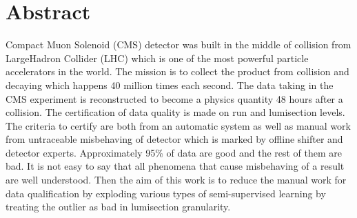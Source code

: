 \chapter*{\Large \center Abstract}


Compact Muon Solenoid (CMS) detector was built in the middle of collision from LargeHadron Collider (LHC) which is one of the most powerful particle accelerators in the world. The mission is to collect the product from collision and decaying which happens 40 million times each second. The data taking in the CMS experiment is reconstructed to become a physics quantity 48 hours after a collision. The certification of data quality is made on run and lumisection levels. The criteria to certify are both from an automatic system as well as manual work from untraceable misbehaving of detector which is marked by offline shifter and detector experts. Approximately 95\% of data are good and the rest of them are bad. It is not easy to say that all phenomena that cause misbehaving of a result are well understood. Then the aim of this work is to reduce the manual work for data qualification by exploding various types of semi-supervised learning by treating the outlier as bad in lumisection granularity.
